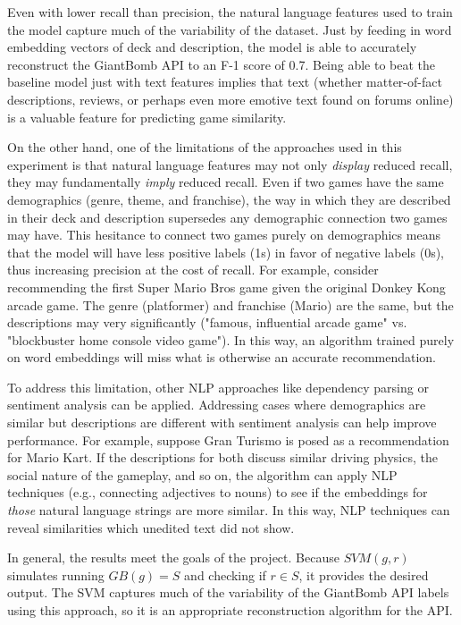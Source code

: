\documentclass[10pt,twocolumn]{article}
\begin{document}
Even with lower recall than precision, the natural language features used to train the model capture much of the variability of the dataset. Just by feeding in word embedding vectors of deck and description, the model is able to accurately reconstruct the GiantBomb API to an F-1 score of 0.7. Being able to beat the baseline model just with text features implies that text (whether matter-of-fact descriptions, reviews, or perhaps even more emotive text found on forums online) is a valuable feature for predicting game similarity.

On the other hand, one of the limitations of the approaches used in this experiment is that natural language features may not only \textit{display} reduced recall, they may fundamentally \textit{imply} reduced recall. Even if two games have the same demographics (genre, theme, and franchise), the way in which they are described in their deck and description supersedes any demographic connection two games may have. This hesitance to connect two games purely on demographics means that the model will have less positive labels (1s) in favor of negative labels (0s), thus increasing precision at the cost of recall. For example, consider recommending the first Super Mario Bros game given the original Donkey Kong arcade game. The genre (platformer) and franchise (Mario) are the same, but the descriptions may very significantly ("famous, influential arcade game" vs. "blockbuster home console video game"). In this way, an algorithm trained purely on word embeddings will miss what is otherwise an accurate recommendation. 

To address this limitation, other NLP approaches like dependency parsing or sentiment analysis can be applied. \cite{Ryan_47} Addressing cases where demographics are similar but descriptions are different with sentiment analysis can help improve performance. For example, suppose Gran Turismo is posed as a recommendation for Mario Kart. If the descriptions for both discuss similar driving physics, the social nature of the gameplay, and so on, the algorithm can apply NLP techniques (e.g., connecting adjectives to nouns) to see if the embeddings for \textit{those} natural language strings are more similar. \cite{Meidl} In this way, NLP techniques can reveal similarities which unedited text did not show.

In general, the results meet the goals of the project. Because $SVM(g, r)$ simulates running $GB(g) = S$ and checking if $r \in S$, it provides the desired output. The SVM captures much of the variability of the GiantBomb API labels using this approach, so it is an appropriate reconstruction algorithm for the API. 
\end{document}
